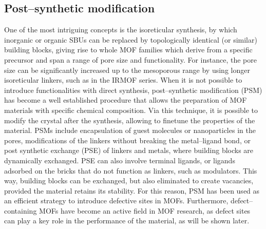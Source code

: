 \subsection*{Post--synthetic modification}
One of the most intriguing concepts is the isoreticular synthesis, by which inorganic or organic SBUs can be replaced by topologically identical (or similar) building blocks, giving rise to whole MOF families which derive from a specific precursor and span a range of pore size and functionality. For instance, the pore size can be significantly increased up to the mesoporous range by using longer isoreticular linkers, such as in the IRMOF series\cite{eddaoudi2002systematic}. When it is not possible to introduce functionalities with direct synthesis, post--synthetic modification (PSM) \cite{wang2009postsynthetic} has become a well established procedure that allows the preparation of MOF materials with specific chemical composition. 
Via this technique, it is possible to modify the crystal after the synthesis, allowing to finetune the properties of the material. PSMs include encapsulation of guest molecules or nanoparticles in the pores, modifications of the linkers without breaking the metal--ligand bond, or post synthetic exchange (PSE) of linkers and metals, where building blocks are dynamically exchanged. 
PSE can also involve terminal ligands, or ligands adsorbed on the bricks that do not function as linkers, such as modulators. This way, building blocks can be exchanged, but also eliminated to create vacancies, provided the material retains its stability. For this reason, PSM has been used as an efficient strategy to introduce defective sites in MOFs. Furthermore, defect--containing MOFs have become an active field in MOF research, as defect sites can play a key role in the performance of the material, as will be shown later. 

